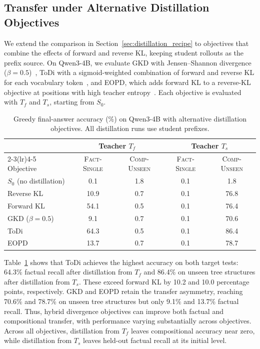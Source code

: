 \documentclass[]{template}
\theoremstyle{plain}
\theoremstyle{definition}
\theoremstyle{remark}
\begin{document}
\subsection{Transfer under Alternative Distillation Objectives}
\label{sec:opd_variants}

We extend the comparison in Section~\ref{sec:distillation_recipe} to objectives that combine the effects of forward and reverse KL, keeping student rollouts as the prefix source. On Qwen3-4B, we evaluate GKD with Jensen--Shannon divergence ($\beta=0.5$)~\citep{agarwal2024policy}, ToDi with a sigmoid-weighted combination of forward and reverse KL for each vocabulary token~\citep{jung2025todi}, and EOPD, which adds forward KL to a reverse-KL objective at positions with high teacher entropy~\citep{jin2026entropyaware}. Each objective is evaluated with $T_f$ and $T_s$, starting from $S_0$.

\begin{table}[htbp]
\centering
\small
\caption{Greedy final-answer accuracy (\%) on Qwen3-4B with alternative distillation objectives. All distillation runs use student prefixes.}
\label{tab:v3_variants}
\setlength{\tabcolsep}{8pt}
\begin{tabular}{@{}lcccc@{}}
\toprule
& \multicolumn{2}{c}{Teacher $T_f$} & \multicolumn{2}{c}{Teacher $T_s$} \\
\cmidrule(lr){2-3}\cmidrule(lr){4-5}
Objective & \textsc{Fact-Single} & \textsc{Comp-Unseen} & \textsc{Fact-Single} & \textsc{Comp-Unseen} \\
\midrule
$S_0$ (no distillation) & 0.1 & 1.8 & 0.1 & 1.8 \\
\midrule
Reverse KL & 10.9 & 0.7 & 0.1 & 76.8 \\
Forward KL & 54.1 & 0.5 & 0.1 & 76.4 \\
GKD ($\beta=0.5$) & 9.1 & 0.7 & 0.1 & 70.6 \\
ToDi & 64.3 & 0.5 & 0.1 & 86.4 \\
EOPD & 13.7 & 0.7 & 0.1 & 78.7 \\
\bottomrule
\end{tabular}
\end{table}

Table~\ref{tab:v3_variants} shows that ToDi achieves the highest accuracy on both target tests: 64.3\% factual recall after distillation from $T_f$ and 86.4\% on unseen tree structures after distillation from $T_s$. These exceed forward KL by 10.2 and 10.0 percentage points, respectively. GKD and EOPD retain the transfer asymmetry, reaching 70.6\% and 78.7\% on unseen tree structures but only 9.1\% and 13.7\% factual recall. Thus, hybrid divergence objectives can improve both factual and compositional transfer, with performance varying substantially across objectives. Across all objectives, distillation from $T_f$ leaves compositional accuracy near zero, while distillation from $T_s$ leaves held-out factual recall at its initial level.
\end{document}
